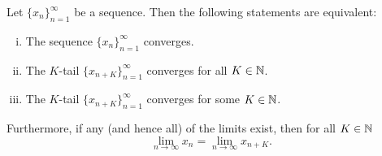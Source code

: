 \begin{prop}
Let $\{ x_n \}_{n=1}^\infty$ be a sequence.  Then the following
statements are equivalent:
\begin{enumerate}[(i)]
\item \label{prop:ktail:i}
The sequence $\{ x_n \}_{n=1}^\infty$ converges.
\item \label{prop:ktail:ii}
The $K$-tail $\{ x_{n+K} \}_{n=1}^\infty$ converges for all $K \in {\mathbb{N}}$.
\item \label{prop:ktail:iii}
The $K$-tail $\{ x_{n+K} \}_{n=1}^\infty$ converges for some $K \in {\mathbb{N}}$.
\end{enumerate}
Furthermore, if any (and hence all) of the limits exist, then for all $K \in {\mathbb{N}}$
\begin{equation*}
\lim_{n\to \infty} x_n = \lim_{n \to \infty} x_{n+K} .
\end{equation*}
\end{prop}

